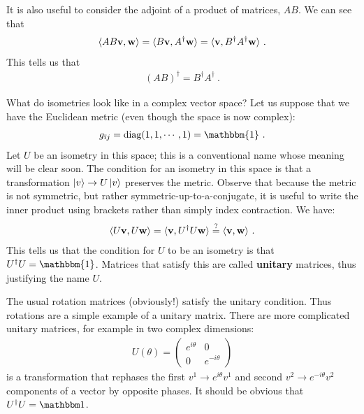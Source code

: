 \documentclass[12pt, oneside]{report}    %
\begin{document}
It is also useful to consider the adjoint of a product of matrices, $AB$. We can see that
\begin{align}
    \langle AB \mathbf{v}, \mathbf{w} \rangle
    =
    \langle B \mathbf{v},  A^\dag \mathbf{w} \rangle
    =
    \langle \mathbf{v}, B^\dag A^\dag \mathbf{w} \rangle \ .
\end{align}
This tells us that
\begin{align}
    (AB)^\dag = B^\dag A^\dag \ .
    \label{eq:adjoint:of:product}
\end{align}



\begin{example} What do isometries look like in a complex vector space? Let us suppose that we have the Euclidean metric (even though the space is now complex):
\begin{align}
    g_{\bar\imath j} = \text{diag}(1,1,\cdots, 1) = \mathbbm{1} \ .
\end{align}
Let $U$ be an isometry in this space; this is a conventional name whose meaning will be clear soon. The condition for an isometry in this space is that a transformation $\left|v\right\rangle \to U\left|v\right\rangle$ preserves the metric. Observe that because the metric is not symmetric, but rather symmetric-up-to-a-conjugate, it is useful to write the inner product using brackets rather than simply index contraction. We have:
\begin{align}
    \langle U\mathbf{v}, U\mathbf{w} \rangle = \langle \mathbf{v}, U^\dag U \mathbf{w} \rangle \stackrel{?}{=} \langle \mathbf{v}, \mathbf{w} \rangle \ .
\end{align}
This tells us that the condition for $U$ to be an isometry is that $U^\dag U = \mathbbm{1}$. Matrices that satisfy this are called \textbf{unitary} matrices, thus justifying the name $U$. 
\end{example}

\begin{example}
The usual rotation matrices (obviously!) satisfy the unitary condition. Thus rotations are a simple example of a unitary matrix. There are more complicated unitary matrices, for example in two complex dimensions:
\begin{align}
    U(\theta) = 
    \begin{pmatrix}
        e^{i\theta} & 0\\
        0 & e^{-i\theta}
    \end{pmatrix}
    \label{eg:unitary:matrix:diagonal}
\end{align}
is a transformation that rephases the first $v^1 \to e^{i\theta}v^1$  and second $v^2 \to e^{-i\theta}v^2$ components of a vector by opposite phases. It should be obvious that $U^\dag U = \one$. 
\end{example}
\end{document}
